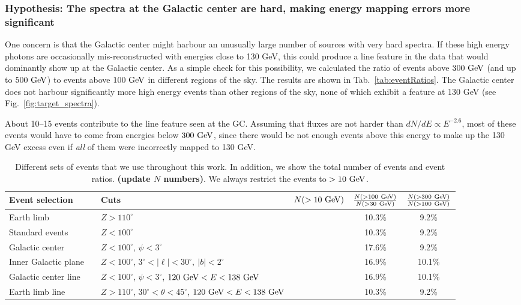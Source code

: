 \documentclass[aps,twocolumn,prd,superscriptaddress,showpacs,nofootinbib,fixfloat]{revtex4}
\newcommand{\GeV}{{\rm ~GeV}}
\begin{document}
\subsubsection{Hypothesis: The spectra at the Galactic center are hard, making
energy mapping errors more significant}

One concern is that the Galactic center might harbour an unusually large
number of sources with very hard spectra. If these high energy photons are
occasionally mis-reconstructed with energies close to 130 GeV, this could
produce a line feature in the data that would dominantly show up at the
Galactic center. As a simple check for this possibility, we calculated the
ratio of events above $300\GeV$ (and up to $500\GeV$) to events above
$100\GeV$ in different regions of the sky. The results are shown in
Tab.~\ref{tab:eventRatios}.  The Galactic center does not harbour significantly
more high energy events than other regions of the sky, none of which
exhibit a feature at 130 GeV (see Fig.~\ref{fig:target_spectra}). 

About 10--15 events contribute to the line feature seen at the GC. Assuming
that fluxes are not harder than $dN/dE \propto E^{-2.6}$, most of these events
would
have to come from energies below $300\GeV$, since there would be not enough
events above this energy to make up the 130 GeV excess even if \emph{all} of
them were incorrectly mapped to 130 GeV. 

\begin{table}
  \begin{tabular}{lllccc}
    \hline
    Event selection &&Cuts & $N(>10\GeV)$ & $\frac{N(>100\GeV)}{N(>30\GeV)}$ & $\frac{N(>300\GeV)}{N(>100\GeV)}$\\
    \hline
    Earth limb           &  & $Z>110^\circ$                                                  &  & 10.3\% & 9.2\% \\
    Standard events      &  & $Z<100^\circ$                                                  &  & 10.3\% & 9.2\% \\
    Galactic center      &  & $Z<100^\circ$, $\psi<3^\circ$                                  &  & 17.6\% & 9.2\% \\
    Inner Galactic plane &  & $Z<100^\circ$, $3^\circ < |\ell| < 30^\circ,\ |b|<2^\circ$     &  & 16.9\% & 10.1\% \\
    Galactic center line &  & $Z<100^\circ$, $\psi<3^\circ$, $120\GeV<E<138\GeV$             &  & 16.9\% & 10.1\% \\
    Earth limb line      &  & $Z>110^\circ$, $30^\circ<\theta<45^\circ$, $120\GeV<E<138\GeV$ &  & 10.3\% & 9.2\% \\ 
    \hline
  \end{tabular}
  \caption{Different sets of events that we use throughout this work. In
  addition, we show the total number of events and event ratios.
  \textbf{(update $N$ numbers)}. We always restrict the events to $>10\GeV$.}
  \label{tab:regions}
\end{table}
\end{document}
